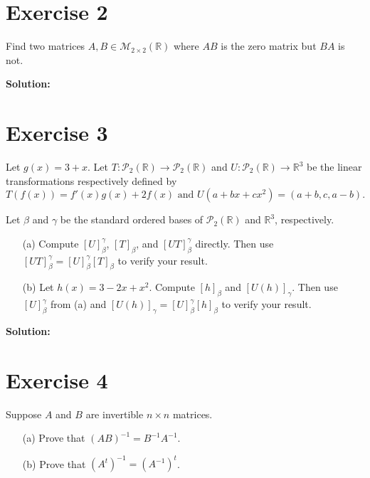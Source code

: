 \documentclass{article}
\begin{document}
\newpage

\section*{Exercise 2}
Find two matrices $A, B \in \mathcal{M}_{2\times 2}(\mathbb{R})$ where $AB$ is the zero matrix but $BA$ is not.

\textbf{Solution: } \\



\newpage

\section*{Exercise 3}
Let $g(x) = 3 + x$. Let $T : \mathcal{P}_2(\mathbb{R}) \to \mathcal{P}_2(\mathbb{R})$ and $U : \mathcal{P}_2(\mathbb{R}) \to \mathbb{R}^3$ be the linear transformations respectively defined by
$$T(f(x)) = f'(x)g(x) + 2f(x) \text{ and } U(a + bx + cx^2) = (a + b, c, a - b).$$

Let $\beta$ and $\gamma$ be the standard ordered bases of $\mathcal{P}_2(\mathbb{R})$ and $\mathbb{R}^3$, respectively.

\begin{enumerate}
\item[(a)] Compute $[U]_{\beta}^{\gamma}$, $[T]_{\beta}$, and $[UT]_{\beta}^{\gamma}$ directly. Then use $[UT]_{\beta}^{\gamma} = [U]_{\beta}^{\gamma}[T]_{\beta}$ to verify your result.
\item[(b)] Let $h(x) = 3 - 2x + x^2$. Compute $[h]_{\beta}$ and $[U(h)]_{\gamma}$. Then use $[U]_{\beta}^{\gamma}$ from (a) and $[U(h)]_{\gamma} = [U]_{\beta}^{\gamma}[h]_{\beta}$ to verify your result.
\end{enumerate}

\textbf{Solution: } \\



\newpage

\section*{Exercise 4}
Suppose $A$ and $B$ are invertible $n \times n$ matrices.

\begin{enumerate}
\item[(a)] Prove that $(AB)^{-1} = B^{-1}A^{-1}$.
\item[(b)] Prove that $(A^t)^{-1} = (A^{-1})^t$.
\end{enumerate}
\end{document}
